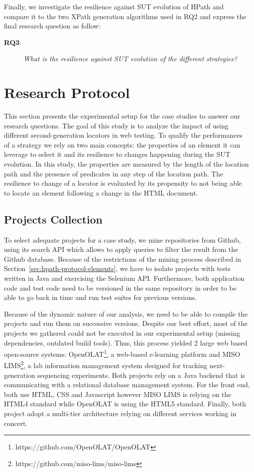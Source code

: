 Finally, we investigate the resilience against SUT evolution of HPath and compare it to the two XPath generation algorithms used in RQ2 and express the final research question as follow:

\begin{description} 
\item[\textbf{RQ3}:]
\emph{What is the resilience against SUT evolution of the different strategies?} 
\end{description} 

\section{Research Protocol}
\label{sec:hpath-protocol}

This section presents the experimental setup for the case studies to answer our research questions. The goal of this study is to analyze the impact of using different second-generation locators in web testing. To qualify the performances of a strategy we rely on two main concepts: the properties of an element it can leverage to select it and its resilience to changes happening during the SUT evolution. In this study, the properties are measured by the length of the location path and the presence of predicates in any step of the location path. The resilience to change of a locator is evaluated by its propensity to not being able to locate an element following a change in the HTML document.

\subsection{Projects Collection}
\label{sec:hpath-protocol-projects}

To select adequate projects for a case study, we mine repositories from Github, using its search API which allows to apply queries to filter the result from the Github database. Because of the restrictions of the mining process described in Section~\ref{sec:hpath-protocol-elements}, we have to isolate projects with tests written in Java and exercising the Selenium API. Furthermore, both application code and test code need to be versioned in the same repository in order to be able to go back in time and run test suites for previous versions.

Because of the dynamic nature of our analysis, we need to be able to compile the projects and run them on successive versions. Despite our best effort, most of the projects we gathered could not be executed in our experimental setup (missing dependencies, outdated build tools). Thus, this process yielded 2 large web based open-source systems: OpenOLAT\footnote{https://github.com/OpenOLAT/OpenOLAT}, a web-based e-learning platform and MISO LIMS\footnote{https://github.com/miso-lims/miso-lims}, a lab information management system designed for tracking next-generation sequencing experiments. Both projects rely on a Java backend that is communicating with a relational database management system. For the front end, both use HTML, CSS and Javascript however MISO LIMS is relying on the HTML4 standard while OpenOLAT is using the HTML5 standard. Finally, both project adopt a multi-tier architecture relying on different services working in concert.

